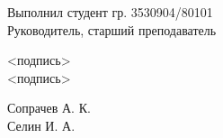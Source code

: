 \begin{titlepage}
\begin{center}
{\begin{multicols}{3}
\begin{flushleft}
          {Выполнил студент гр. 3530904/80101}\\[0.2cm]

          {Руководитель, старший преподаватель}

        \end{flushleft}

        \begin{flushright}

          <подпись>\\[0.9cm]

          <подпись>

        \end{flushright}
        \begin{flushright}

          {Сопрачев А. К.}\\[0.9cm] %


          Селин И. А. %

        \end{flushright}
      \end{multicols}
    }
    \vspace{4.7cm}



    \vfill %
  \end{center}
\end{titlepage}
\newpage
